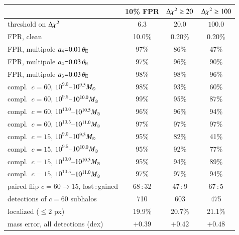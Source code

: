 \begin{tabular}{@{}lccc@{}}
\toprule
 & 10\% FPR & $\Delta\chi^2\ge20$ & $\Delta\chi^2\ge100$ \\
\midrule
threshold on $\Delta\chi^2$ & $6.3$ & $20.0$ & $100.0$ \\
FPR, clean & 10.0\% & 0.20\% & 0.20\% \\
FPR, multipole $a_4{=}0.01\,\theta_{\rm E}$ & 97\% & 86\% & 47\% \\
FPR, multipole $a_4{=}0.03\,\theta_{\rm E}$ & 97\% & 96\% & 90\% \\
FPR, multipole $a_3{=}0.03\,\theta_{\rm E}$ & 98\% & 98\% & 96\% \\
\addlinespace[2pt]
compl.\ $c{=}60$, $10^{9.0}$--$10^{9.5}M_\odot$ & 98\% & 93\% & 60\% \\
compl.\ $c{=}60$, $10^{9.5}$--$10^{10.0}M_\odot$ & 99\% & 95\% & 87\% \\
compl.\ $c{=}60$, $10^{10.0}$--$10^{10.5}M_\odot$ & 96\% & 96\% & 94\% \\
compl.\ $c{=}60$, $10^{10.5}$--$10^{11.0}M_\odot$ & 97\% & 97\% & 97\% \\
compl.\ $c{=}15$, $10^{9.0}$--$10^{9.5}M_\odot$ & 95\% & 82\% & 41\% \\
compl.\ $c{=}15$, $10^{9.5}$--$10^{10.0}M_\odot$ & 95\% & 92\% & 77\% \\
compl.\ $c{=}15$, $10^{10.0}$--$10^{10.5}M_\odot$ & 95\% & 94\% & 89\% \\
compl.\ $c{=}15$, $10^{10.5}$--$10^{11.0}M_\odot$ & 97\% & 97\% & 94\% \\
paired flip $c{=}60\to15$, lost\,:\,gained & 68\,:\,32 & 47\,:\,9 & 67\,:\,5 \\
\addlinespace[2pt]
detections of $c{=}60$ subhalos & 710 & 603 & 475 \\
localized ($\le2$ px) & 19.9\% & 20.7\% & 21.1\% \\
mass error, all detections (dex) & $+0.39$ & $+0.42$ & $+0.48$ \\
\bottomrule
\end{tabular}
